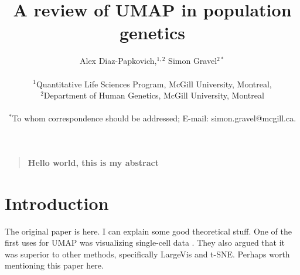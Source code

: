\documentclass[12pt]{article}
\title{A review of UMAP in population genetics}
\author
{Alex Diaz-Papkovich,$^{1,2}$ Simon Gravel$^{2\ast}$\\
\\
\normalsize{$^{1}$Quantitative Life Sciences Program, McGill University, Montreal,}\\
\normalsize{$^{2}$Department of Human Genetics, McGill University, Montreal}\\
\\
\normalsize{$^\ast$To whom correspondence should be addressed; E-mail:  simon.gravel@mcgill.ca.}
}
\date{}
\newenvironment{sciabstract}{%
\begin{quote} \bf}
{\end{quote}}
\begin{document}
 


\baselineskip24pt


\maketitle 




\begin{sciabstract}
Hello world, this is my abstract
\end{sciabstract}




\section*{Introduction}
The original paper is here. I can explain some good theoretical stuff\cite{mcinnes_umap_2018}. One of the first uses for UMAP was visualizing single-cell data \cite{becht_dimensionality_2019}. They also argued that it was superior to other methods, specifically LargeVis and t-SNE. Perhaps worth mentioning this paper here\cite{kobak_art_2019}.
\end{document}
